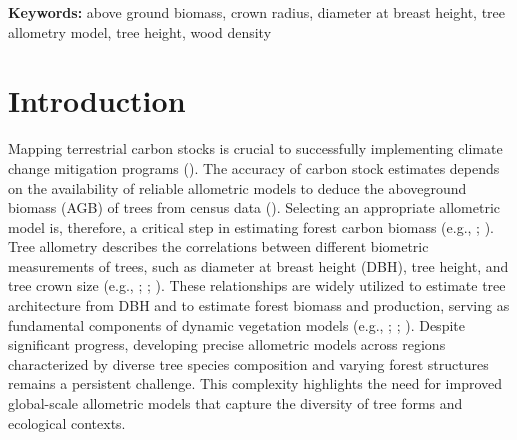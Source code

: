 \documentclass[
  12pt,
  letterpaper,
  DIV=11,
  numbers=noendperiod]{scrartcl}
\begin{document}
\textbf{Keywords:} above ground biomass, crown radius, diameter at
breast height, tree allometry model, tree height, wood density

\section{Introduction}\label{introduction}

Mapping terrestrial carbon stocks is crucial to successfully
implementing climate change mitigation programs
(). The accuracy of carbon
stock estimates depends on the availability of reliable allometric
models to deduce the aboveground biomass (AGB) of trees from census data
(). Selecting an appropriate
allometric model is, therefore, a critical step in estimating forest
carbon biomass (e.g., ;
). Tree allometry describes
the correlations between different biometric measurements of trees, such
as diameter at breast height (DBH), tree height, and tree crown size
(e.g., ;
; ). These relationships are widely utilized to estimate tree
architecture from DBH and to estimate forest biomass and production,
serving as fundamental components of dynamic vegetation models (e.g.,
;
;
). Despite significant
progress, developing precise allometric models across regions
characterized by diverse tree species composition and varying forest
structures remains a persistent challenge. This complexity highlights
the need for improved global-scale allometric models that capture the
diversity of tree forms and ecological contexts.
\end{document}
